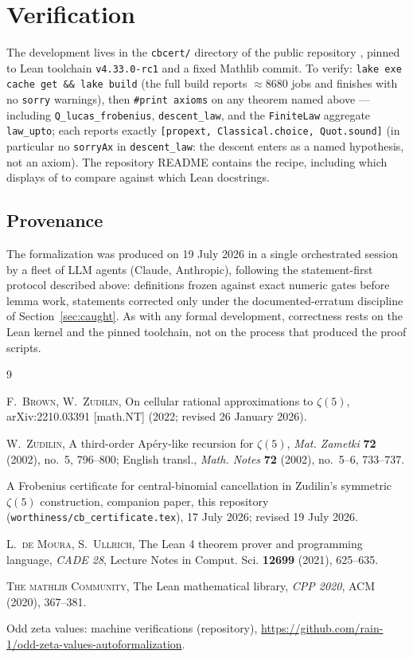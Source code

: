 \documentclass[11pt]{article}
\theoremstyle{definition}
\newcommand{\lean}[1]{\texttt{#1}}
\begin{document}
\section{Verification}\label{sec:verify}

The development lives in the \lean{cbcert/} directory of the public
repository \cite{repo}, pinned to Lean toolchain
\lean{v4.33.0-rc1} and a fixed Mathlib commit. To verify:
\lean{lake exe cache get \&\& lake build} (the full build reports
$\approx 8680$ jobs and finishes with no \lean{sorry} warnings), then
\lean{\#print axioms} on any theorem named above — including
\lean{Q\_lucas\_frobenius}, \lean{descent\_law}, and the \lean{FiniteLaw}
aggregate \lean{law\_upto}; each reports exactly
\lean{[propext, Classical.choice, Quot.sound]} (in particular no
\lean{sorryAx} in \lean{descent\_law}: the descent enters as a named
hypothesis, not an axiom). The repository README
contains the recipe, including which displays of \cite{BZ22} to compare
against which Lean docstrings.

\subsection*{Provenance}

The formalization was produced on 19 July 2026 in a single orchestrated
session by a fleet of LLM agents (Claude, Anthropic), following the
statement-first protocol described above: definitions frozen against exact
numeric gates before lemma work, statements corrected only under the
documented-erratum discipline of Section~\ref{sec:caught}. As with any
formal development, correctness rests on the Lean kernel and the pinned
toolchain, not on the process that produced the proof scripts.

\begin{thebibliography}{9}

\textsc{F.~Brown, W.~Zudilin},
On cellular rational approximations to $\zeta(5)$,
arXiv:2210.03391 [math.NT] (2022; revised 26 January 2026).

\textsc{W.~Zudilin},
A third-order Ap\'ery-like recursion for $\zeta(5)$,
\emph{Mat. Zametki} \textbf{72} (2002), no.~5, 796--800;
English transl., \emph{Math. Notes} \textbf{72} (2002), no.~5--6, 733--737.

A Frobenius certificate for central-binomial cancellation in Zudilin's
symmetric $\zeta(5)$ construction, companion paper, this repository
(\lean{worthiness/cb\_certificate.tex}), 17 July 2026; revised 19 July 2026.

\textsc{L.~de Moura, S.~Ullrich},
The Lean 4 theorem prover and programming language,
\emph{CADE 28}, Lecture Notes in Comput. Sci. \textbf{12699} (2021), 625--635.

\textsc{The mathlib Community},
The Lean mathematical library,
\emph{CPP 2020}, ACM (2020), 367--381.

Odd zeta values: machine verifications (repository),
\url{https://github.com/rain-1/odd-zeta-values-autoformalization}.

\end{thebibliography}
\end{document}
